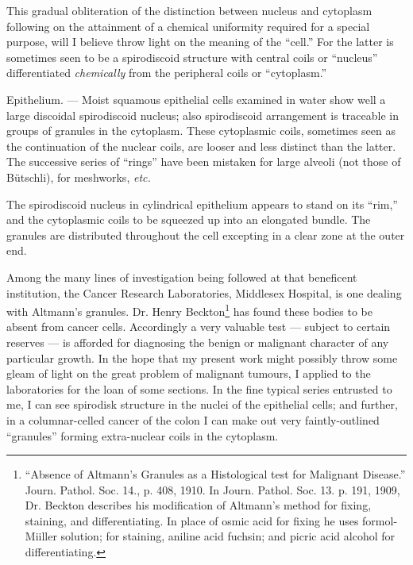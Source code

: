 \documentclass[a4paper, 12pt, oneside]{article}
\begin{document}
This gradual obliteration of the distinction between nucleus and cytoplasm following on the attainment of a chemical uniformity required for a special purpose, will I believe throw light on the meaning of the ``cell.'' For the latter is sometimes seen to be a spirodiscoid structure with central coils or ``nucleus'' differentiated \emph{chemically} from the peripheral coils or ``cytoplasm.''

Epithelium. --- Moist squamous epithelial cells examined in water show well a large discoidal spirodiscoid nucleus; also spirodiscoid arrangement is traceable in groups of granules in the cytoplasm. These cytoplasmic coils, sometimes seen as the continuation of the nuclear coils, are looser and less distinct than the latter. The successive series of ``rings'' have been mistaken for large alveoli (not those of Bütschli), for meshworks, \emph{etc.}

The spirodiscoid nucleus in cylindrical epithelium appears to stand on its ``rim,'' and the cytoplasmic coils to be squeezed up into an elongated bundle. The granules are distributed throughout the cell excepting in a clear zone at the outer end.

Among the many lines of investigation being followed at that beneficent institution, the Cancer Research Laboratories, Middlesex Hospital, is one dealing with Altmann's granules. Dr. Henry Beckton\footnote{``Absence of Altmann's Granules as a Histological test for Malignant Disease.'' Journ. Pathol. Soc. 14., p. 408, 1910. In Journ. Pathol. Soc. 13. p. 191, 1909, Dr. Beckton describes his modification of Altmann's method for fixing, staining, and differentiating. In place of osmic acid for fixing he uses formol-Miiller solution; for staining, aniline acid fuchsin; and picric acid alcohol for differentiating.} has found these bodies to be absent from cancer cells. Accordingly a very valuable test --- subject to certain reserves --- is afforded for diagnosing the benign or malignant character of any particular growth. In the hope that my present work might possibly throw some gleam of light on the great problem of malignant tumours, I applied to the laboratories for the loan of some sections. In the fine typical series entrusted to me, I can see spirodisk structure in the nuclei of the epithelial cells; and further, in a columnar-celled cancer of the colon I can make out very faintly-outlined ``granules'' forming extra-nuclear coils in the cytoplasm.
\end{document}
